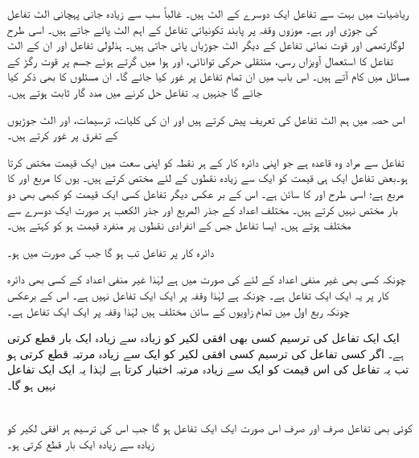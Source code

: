         ریاضیات میں بہت سے تفاعل ایک دوسرے کے الٹ ہیں۔ غالباً سب سے زیادہ جانی پہچانی الٹ تفاعل کی جوڑی  اور  ہے۔ موزوں وقفہ پر پابند تکونیاتی تفاعل کے اہم الٹ پائے  جاتے ہیں۔ اسی طرح  لوگارتھمی اور قوت نمائی تفاعل کے دیگر الٹ جوڑیاں پائی جاتی ہیں۔ ہذلولی تفاعل اور ان کے الٹ تفاعل کا استعمال آویزاں رسی، منتقلی حرکی توانائی، اور ہوا میں گرتے ہوئے جسم پر قوت رگڑ کے مسائل میں کام آتے ہیں۔ اس باب میں ان تمام تفاعل پر غور کیا جائے گا۔ ان مسئلوں کا بھی ذکر کیا جائے گا جنہیں یہ تفاعل حل کرنے میں مدد گار ثابت ہوتے ہیں۔

اس حصہ میں ہم الٹ تفاعل کی تعریف پیش کرتے ہیں اور ان کی کلیات، ترسیمات، اور الٹ جوڑیوں کے تفرق پر غور کرتے ہیں۔

تفاعل سے مراد وہ قاعدہ ہے جو اپنی دائرہ کار کے ہر نقطہ کو اپنی سعت میں ایک قیمت مختص کرتا ہو۔بعض تفاعل ایک ہی قیمت کو ایک سے زیادہ  نقطوں  کے لئے مختص کرتے ہیں۔ یوں  کا مربع اور  کا مربع  ہے؛ اسی طرح  اور  کا سائن  ہے۔ اس کے بر عکس دیگر تفاعل کسی ایک قیمت کو کبھی بھی دو بار مختص نہیں کرتے ہیں۔ مختلف اعداد کے جذر المربع اور جذر الکعب ہر صورت ایک دوسرے سے مختلف ہوتے ہیں۔ ایسا تفاعل جس کے انفرادی نقطوں پر منفرد قیمت ہو کو  کہتے ہیں۔

دائرہ کار  پر تفاعل   تب  ہو گا جب  کی صورت میں  ہو۔

چونکہ کسی بھی غیر منفی اعداد کے لئے  کی صورت میں  ہے  لہٰذا  غیر منفی اعداد کے کسی بھی دائرہ کار پر یہ ایک ایک تفاعل ہے۔
چونکہ  ہے لہٰذا وقفہ  پر  ایک ایک تفاعل نہیں ہے۔ اس کے برعکس چونکہ ربع اول میں تمام زاویوں کے سائن مختلف ہیں لہٰذا وقفہ  پر  ایک ایک تفاعل ہے۔

ایک ایک تفاعل  کی ترسیم کسی بھی افقی لکیر کو زیادہ سے زیادہ ایک بار قطع کرتی ہے۔ اگر کسی تفاعل کی ترسیم کسی افقی لکیر کو ایک سے زیادہ مرتبہ قطع کرتی ہو تب یہ تفاعل  کی اس قیمت کو ایک سے زیادہ مرتبہ اختیار کرتا ہے لہٰذا یہ ایک ایک تفاعل نہیں ہو گا۔

\\
کوئی بھی تفاعل  صرف اور صرف اس صورت ایک ایک تفاعل ہو گا جب اس کی ترسیم ہر افقی لکیر کو زیادہ سے زیادہ ایک بار قطع کرتی ہو۔ 

